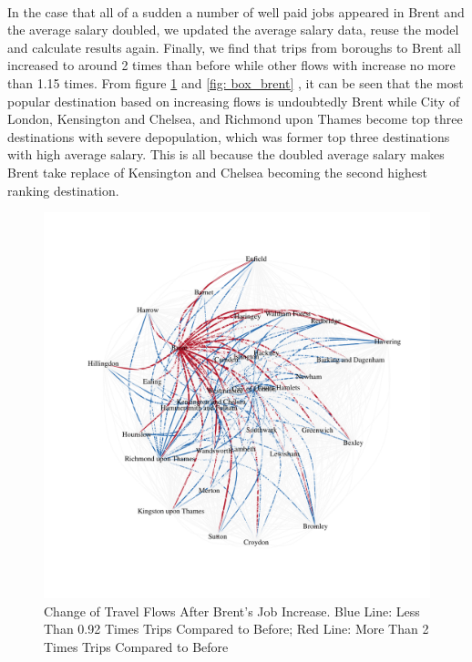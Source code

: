 \documentclass[a4paper,reqno,]{article}
\begin{document}
\begin{enumerate}
\\In the case that all of a sudden a number of well paid jobs appeared in Brent and the average salary doubled, we updated the average salary data, reuse the model and calculate results again. Finally, we find that trips from boroughs to Brent all increased to around 2 times than before while other flows with increase no more than 1.15 times. From figure \ref{fig: brent} and \ref{fig: box_brent} , it can be seen that the most popular destination based on increasing flows is undoubtedly Brent while City of London, Kensington and Chelsea, and Richmond upon Thames become top three destinations with severe depopulation, which was former top three destinations with high average salary. This is all because the doubled average salary makes Brent take replace of Kensington and Chelsea becoming the second highest ranking destination.
\begin{figure}[H]
\centering
\begin{minipage}[b]{0.5\textheight}
\centering
    \captionsetup{width=1\linewidth}
    \includegraphics[clip, trim=1.5cm 3cm 2cm 2cm,width=1\textwidth]{images/SIM/Brent_final.pdf}
    \caption{Change of Travel Flows After Brent's Job Increase. Blue Line: Less Than 0.92 Times Trips Compared to Before; Red Line: More Than 2 Times Trips Compared to Before}\label{fig: brent}
\end{minipage}

\end{figure}
\end{enumerate}
\end{document}
